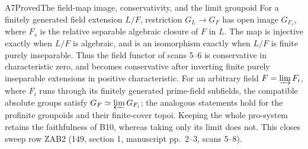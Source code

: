 \begin{result}{A7}{Proved}{The field-map image, conservativity, and the limit groupoid}
\label{res:A7}
For a finitely generated field extension $L/F$, restriction
$G_L\to G_F$ has open image $G_{F_s}$, where $F_s$ is the relative
separable algebraic closure of $F$ in $L$. The map is injective
exactly when $L/F$ is algebraic, and is an isomorphism exactly when
$L/F$ is finite purely inseparable. Thus the field functor of
scans 5--6 is conservative in characteristic zero, and becomes
conservative after inverting finite purely inseparable extensions
in positive characteristic.
For an arbitrary field $F=\varinjlim F_i$, where $F_i$ runs through
its finitely generated prime-field subfields, the compatible
absolute groups satisfy $G_F\simeq\varprojlim G_{F_i}$; the analogous
statements hold for the profinite groupoids and their finite-cover
topoi. Keeping the whole pro-system retains the faithfulness of
B10, whereas taking only its limit does not. This closes sweep
row ZAB2 (149, section 1, manuscript pp.~2--3, scans 5--8).
\end{result}
